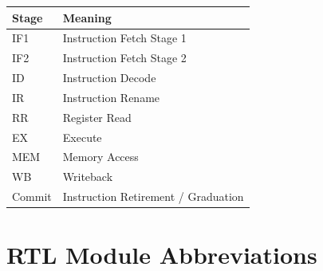 \begin{center}
\renewcommand{\arraystretch}{1.3}
\begin{tabular}{@{}ll@{}}
\toprule
\textbf{Stage} & \textbf{Meaning} \\
\midrule
IF1 & Instruction Fetch Stage 1 \\
IF2 & Instruction Fetch Stage 2 \\
ID & Instruction Decode \\
IR & Instruction Rename \\
RR & Register Read \\
EX & Execute \\
MEM & Memory Access \\
WB & Writeback \\
Commit & Instruction Retirement / Graduation \\
\bottomrule
\end{tabular}
\end{center}

\chapter{RTL Module Abbreviations}

